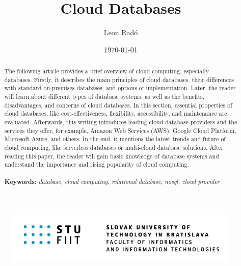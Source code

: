 \documentclass[12pt, a4paper]{article}
\title{\Huge Cloud Databases}
\author{\Large Leon Radó}
\date{\today}
\begin{document}
\maketitle
\begin{figure}[b]
    \centering
    \includegraphics[width=0.8\linewidth]{images/STU-FIIT.png}
\end{figure}
\thispagestyle{empty}

\clearpage
\tableofcontents

\clearpage
\begin{abstract}
    The following article provides a brief overview of cloud computing, especially databases. Firstly, it describes the main principles of cloud databases, their differences with standard on-premises databases, and options of implementation. Later, the reader will learn about different types of database systems, as well as the benefits, disadvantages, and concerns of cloud databases. In this section, essential properties of cloud databases, like cost-effectiveness, flexibility, accessibility, and maintenance are evaluated. Afterwards, this writing introduces leading cloud database providers and the services they offer, for example, Amazon Web Services (AWS), Google Cloud Platform, Microsoft Azure, and others. In the end, it mentions the latest trends and future of cloud computing, like serverless databases or multi-cloud database solutions. After reading this paper, the reader will gain basic knowledge of database systems and understand the importance and rising popularity of cloud computing.\\\\
    \footnotesize{\textbf{Keywords: }\textit{database, cloud computing, relational database, nosql, cloud provider}}
\end{abstract}
\clearpage
\end{document}
